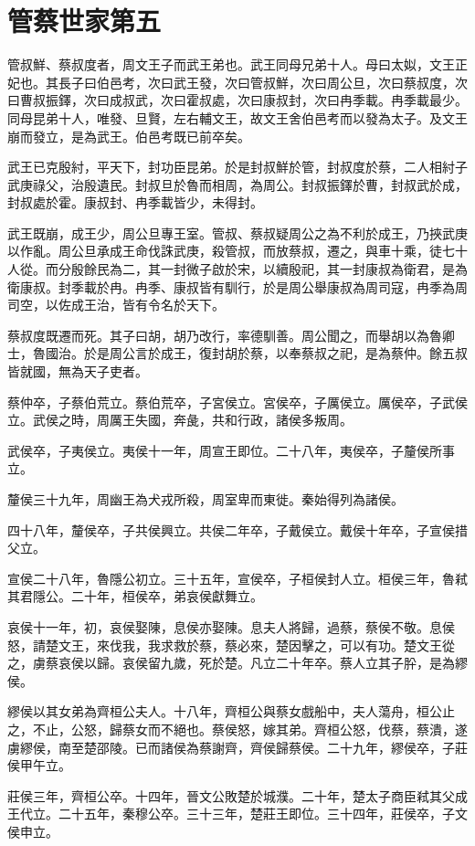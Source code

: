 \chapter{管蔡世家第五}

管叔鮮、蔡叔度者，周文王子而武王弟也。武王同母兄弟十人。母曰太姒，文王正妃也。其長子曰伯邑考，次曰武王發，次曰管叔鮮，次曰周公旦，次曰蔡叔度，次曰曹叔振鐸，次曰成叔武，次曰霍叔處，次曰康叔封，次曰冉季載。冉季載最少。同母昆弟十人，唯發、旦賢，左右輔文王，故文王舍伯邑考而以發為太子。及文王崩而發立，是為武王。伯邑考既已前卒矣。

武王已克殷紂，平天下，封功臣昆弟。於是封叔鮮於管，封叔度於蔡，二人相紂子武庚祿父，治殷遺民。封叔旦於魯而相周，為周公。封叔振鐸於曹，封叔武於成，封叔處於霍。康叔封、冉季載皆少，未得封。

武王既崩，成王少，周公旦專王室。管叔、蔡叔疑周公之為不利於成王，乃挾武庚以作亂。周公旦承成王命伐誅武庚，殺管叔，而放蔡叔，遷之，與車十乘，徒七十人從。而分殷餘民為二，其一封微子啟於宋，以續殷祀，其一封康叔為衛君，是為衛康叔。封季載於冉。冉季、康叔皆有馴行，於是周公舉康叔為周司寇，冉季為周司空，以佐成王治，皆有令名於天下。

蔡叔度既遷而死。其子曰胡，胡乃改行，率德馴善。周公聞之，而舉胡以為魯卿士，魯國治。於是周公言於成王，復封胡於蔡，以奉蔡叔之祀，是為蔡仲。餘五叔皆就國，無為天子吏者。

蔡仲卒，子蔡伯荒立。蔡伯荒卒，子宮侯立。宮侯卒，子厲侯立。厲侯卒，子武侯立。武侯之時，周厲王失國，奔彘，共和行政，諸侯多叛周。

武侯卒，子夷侯立。夷侯十一年，周宣王即位。二十八年，夷侯卒，子釐侯所事立。

釐侯三十九年，周幽王為犬戎所殺，周室卑而東徙。秦始得列為諸侯。

四十八年，釐侯卒，子共侯興立。共侯二年卒，子戴侯立。戴侯十年卒，子宣侯措父立。

宣侯二十八年，魯隱公初立。三十五年，宣侯卒，子桓侯封人立。桓侯三年，魯弒其君隱公。二十年，桓侯卒，弟哀侯獻舞立。

哀侯十一年，初，哀侯娶陳，息侯亦娶陳。息夫人將歸，過蔡，蔡侯不敬。息侯怒，請楚文王，來伐我，我求救於蔡，蔡必來，楚因擊之，可以有功。楚文王從之，虜蔡哀侯以歸。哀侯留九歲，死於楚。凡立二十年卒。蔡人立其子肸，是為繆侯。

繆侯以其女弟為齊桓公夫人。十八年，齊桓公與蔡女戲船中，夫人蕩舟，桓公止之，不止，公怒，歸蔡女而不絕也。蔡侯怒，嫁其弟。齊桓公怒，伐蔡，蔡潰，遂虜繆侯，南至楚邵陵。已而諸侯為蔡謝齊，齊侯歸蔡侯。二十九年，繆侯卒，子莊侯甲午立。

莊侯三年，齊桓公卒。十四年，晉文公敗楚於城濮。二十年，楚太子商臣弒其父成王代立。二十五年，秦穆公卒。三十三年，楚莊王即位。三十四年，莊侯卒，子文侯申立。

